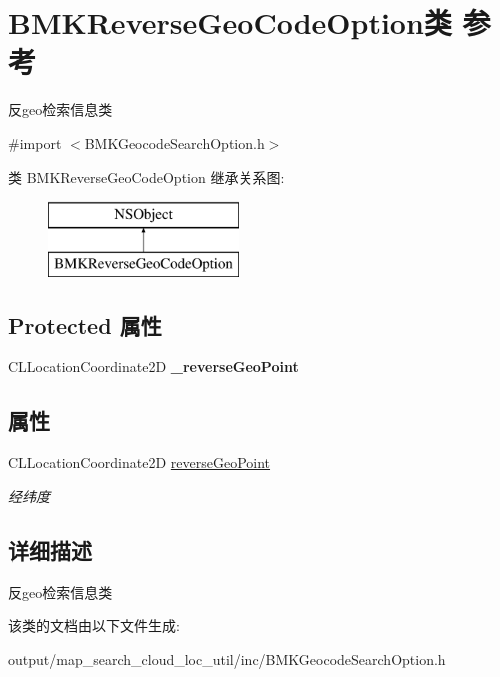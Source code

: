 \hypertarget{interface_b_m_k_reverse_geo_code_option}{\section{B\+M\+K\+Reverse\+Geo\+Code\+Option类 参考}
\label{interface_b_m_k_reverse_geo_code_option}
}


反geo检索信息类  




{\ttfamily \#import $<$B\+M\+K\+Geocode\+Search\+Option.\+h$>$}

类 B\+M\+K\+Reverse\+Geo\+Code\+Option 继承关系图\+:\begin{figure}[H]
\begin{center}
\leavevmode
\includegraphics[height=2.000000cm]{interface_b_m_k_reverse_geo_code_option}
\end{center}
\end{figure}
\subsection*{Protected 属性}
\begin{DoxyCompactItemize}
\item 
\hypertarget{interface_b_m_k_reverse_geo_code_option_aa133954248beab4577dfab30a851741a}{C\+L\+Location\+Coordinate2\+D {\bfseries \+\_\+reverse\+Geo\+Point}}\label{interface_b_m_k_reverse_geo_code_option_aa133954248beab4577dfab30a851741a}

\end{DoxyCompactItemize}
\subsection*{属性}
\begin{DoxyCompactItemize}
\item 
\hypertarget{interface_b_m_k_reverse_geo_code_option_aaa7bef4496d51b86817745915fe5478e}{C\+L\+Location\+Coordinate2\+D \hyperlink{interface_b_m_k_reverse_geo_code_option_aaa7bef4496d51b86817745915fe5478e}{reverse\+Geo\+Point}}\label{interface_b_m_k_reverse_geo_code_option_aaa7bef4496d51b86817745915fe5478e}

\begin{DoxyCompactList}\small\item\em 经纬度 \end{DoxyCompactList}\end{DoxyCompactItemize}


\subsection{详细描述}
反geo检索信息类 

该类的文档由以下文件生成\+:\begin{DoxyCompactItemize}
\item 
output/map\+\_\+search\+\_\+cloud\+\_\+loc\+\_\+util/inc/B\+M\+K\+Geocode\+Search\+Option.\+h\end{DoxyCompactItemize}
